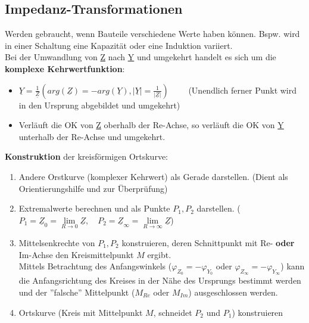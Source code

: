 \subsection{Impedanz-Transformationen}
Werden gebraucht, wenn Bauteile verschiedene Werte haben können. Bspw. wird in
einer Schaltung eine Kapazität oder eine Induktion variiert.\\
Bei der Umwandlung von \underline{Z} nach \underline{Y} und umgekehrt handelt es sich um die
\textbf{komplexe Kehrwertfunktion}: 
\begin{itemize}
  \item $\underline{Y} = \frac{1}{\underline{Z}} 
  ( arg(\underline{Z}) = -arg(\underline{Y}),  
  |\underline{Y}| = \frac{1}{| \underline{Z} |}) \qquad$
  (Unendlich ferner Punkt wird in den Ursprung abgebildet und umgekehrt)
  \item Verläuft die OK von \underline{Z} oberhalb der Re-Achse, so verläuft die OK von
  \underline{Y} unterhalb der Re-Achse und umgekehrt.
\end{itemize} 
\textbf{Konstruktion} der kreisförmigen Ortskurve:
\begin{enumerate}
  \item Andere Orstkurve (komplexer Kehrwert) als Gerade darstellen. (Dient als Orientierungshilfe
  und zur Überprüfung)
  \item Extremalwerte berechnen und als Punkte $P_1, P_2$ darstellen. 
	($P_1 = \underline{Z}_0 = \lim\limits_{R \rightarrow 0}\underline{Z}, \quad
	  P_2 = \underline{Z}_\infty = \lim\limits_{R \rightarrow \infty}\underline{Z} $)
  \item Mittelsenkrechte von $P_1, P_2$ konstruieren, deren Schnittpunkt mit Re- \textbf{oder}
  Im-Achse den Kreismittelpunkt $M$ ergibt. \\
  Mittels Betrachtung des Anfangswinkels ($\varphi_{Z_0} = - \varphi_{Y_0}$  oder
  $\varphi_{Z_\infty} = - \varphi_{Y_\infty}$) kann die Anfangsrichtung des Kreises in
  der Nähe des Ursprungs bestimmt werden und der ''falsche'' Mittelpunkt ($M_{Re}$ oder $M_{Im}$)
  ausgeschlossen werden.
  \item Ortskurve (Kreis mit Mittelpunkt $M$, schneidet $P_2$ und $P_1$) konstruieren
\end{enumerate}

